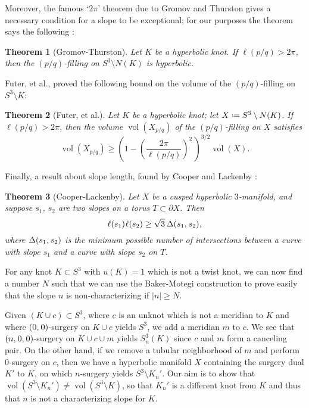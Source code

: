 \documentclass[11pt,usenames,dvipsnames,reqno]{amsart}
\newcommand{\vol}{\operatorname{vol}}
\newcommand{\defeq}{\mathrel{\vcenter{\baselineskip0.5ex\lineskiplimit0pt\hbox{\scriptsize.}\hbox{\scriptsize.}}}=}
\newcommand{\hs}{\hspace{0.05em}} %
\newtheorem{theorem}{Theorem}
\numberwithin{theorem}{section}
\theoremstyle{ex}
\theoremstyle{rem}
\begin{document}
Moreover, the famous `$2\pi$' theorem due to Gromov and Thurston gives a necessary condition for a slope to be exceptional; for our purposes the theorem says the following \cite{cooper-lackenby}:
\begin{theorem}[Gromov-Thurston]
Let $K$ be a hyperbolic knot. If $\ell(p/q)>2\pi$, then the $(p/q)$-filling on $S^3\setminus N(K)$ is hyperbolic.
\end{theorem}
Futer, et al., \cite{futer} proved the following bound on the volume of the $(p/q)$-filling on $S^3\setminus K$:
\begin{theorem}[Futer, et al.]
Let $K$ be a hyperbolic knot; let $X\defeq S^3\setminus N(K)$. If $\ell(p/q)>2\pi$, then the volume $\vol(X_{p/q})$ of the $(p/q)$-filling on $X$ satisfies
\[\vol(X_{p/q})\ge\left(1-\left(\frac{2\pi}{\ell(p/q)}\right)^2\,\right)^{3/2}\vol(X).\]
\end{theorem}
Finally, a result about slope length, found by Cooper and Lackenby \cite{cooper-lackenby}:
\begin{theorem}[Cooper-Lackenby]
Let $X$ be a cusped hyperbolic $3$-manifold, and suppose $s_1$, $s_2$ are two slopes on a torus $T\subset \partial X$. Then
\[\ell(s_1)\hs\ell(s_2)\ge\sqrt{3}\hspace{0.2em}\Delta(s_1,\hs s_2),\]
where $\Delta(s_1,\hs s_2)$ is the minimum possible number of intersections between a curve with slope $s_1$ and a curve with slope $s_2$ on $T$.
\end{theorem}
For any knot $K\subset S^3$ with $u(K)=1$ which is not a twist knot, we can now find a number $N$ such that we can use the Baker-Motegi construction to prove easily that the slope $n$ is non-characterizing if $|n|\ge N$.

Given $(K\cup c)\subset S^3$, where $c$ is an unknot which is not a meridian to $K$ and where $(0,\hs0)$-surgery on $K\cup c$ yields $S^3$, we add a meridian $m$ to $c$. We see that $(n,\hs0,\hs0)$-surgery on $K\cup c\cup m$ yields $S^3_n(K)$ since $c$ and $m$ form a canceling pair. On the other hand, if we remove a tubular neighborhood of $m$ and perform $0$-surgery on $c$, then we have a hyperbolic manifold $X$ containing the surgery dual $K'$ to $K$, on which $n$-surgery yields $S^3\setminus K_n'$. Our aim is to show that $\vol(S^3\setminus K_n')\ne\vol(S^3\setminus K)$, so that $K_n'$ is a different knot from $K$ and thus that $n$ is not a characterizing slope for $K$.
\end{document}
